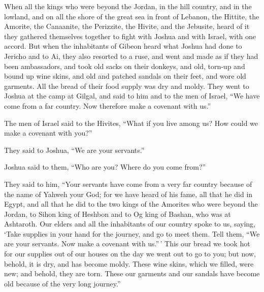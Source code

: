  When all the kings who were beyond the Jordan, in the
hill country, and in the lowland, and on all the shore of the great sea
in front of Lebanon, the Hittite, the Amorite, the Canaanite, the
Perizzite, the Hivite, and the Jebusite, heard of it  they
gathered themselves together to fight with Joshua and with Israel, with
one accord.  But when the inhabitants of Gibeon heard what
Joshua had done to Jericho and to Ai,  they also resorted
to a ruse, and went and made as if they had been ambassadors, and took
old sacks on their donkeys, and old, torn-up and bound up wine skins,
 and old and patched sandals on their feet, and wore old
garments. All the bread of their food supply was dry and moldy.
 They went to Joshua at the camp at Gilgal, and said to
him and to the men of Israel, ``We have come from a far country. Now
therefore make a covenant with us.''

 The men of Israel said to the Hivites, ``What if you live
among us? How could we make a covenant with you?''

 They said to Joshua, ``We are your servants.''

Joshua said to them, ``Who are you? Where do you come from?''

 They said to him, ``Your servants have come from a very
far country because of the name of Yahweh your God; for we have heard of
his fame, all that he did in Egypt,  and all that he did
to the two kings of the Amorites who were beyond the Jordan, to Sihon
king of Heshbon and to Og king of Bashan, who was at Ashtaroth.
 Our elders and all the inhabitants of our country spoke
to us, saying, `Take supplies in your hand for the journey, and go to
meet them. Tell them, ``We are your servants. Now make a covenant with
us.''\,'  This our bread we took hot for our supplies out
of our houses on the day we went out to go to you; but now, behold, it
is dry, and has become moldy.  These wine skins, which we
filled, were new; and behold, they are torn. These our garments and our
sandals have become old because of the very long journey.''

